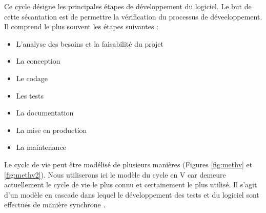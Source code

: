 Ce cycle désigne les principales étapes de développement du logiciel.
Le but de cette sécantation est de permettre la vérification du processus de déveeloppement.
Il comprend le plus souvent les étapes suivantes :
\begin{itemize}
        \item L'analyse des besoins et la faisabilité du projet
        \item La conception
        \item Le codage
        \item Les tests
        \item La documentation
        \item La mise en production
        \item La maintenance
\end{itemize}
Le cycle de vie peut être modélisé de plusieurs manières (Figures \ref{fig:methv}  et \ref{fig:methv2}).
Nous utiliserons ici le modèle du cycle en V car demeure actuellement le cycle de vie le 
plus connu et certainement le plus utilisé. 
Il s'agit d'un modèle en cascade dans lequel le 
développement des tests et du logiciel sont effectués 
de manière synchrone \cite{audibert2009uml}.

